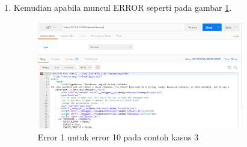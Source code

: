 \begin{enumerate}
\item Kemudian apabila muncul ERROR seperti pada gambar \ref{fig:er1}.
\begin{figure}[!htbp]
	\centerline{\includegraphics[width=0.85\textwidth]{figures/10/er1.PNG}}
	\caption{Error 1 untuk error 10 pada contoh kasus 3}
	\label{fig:er1}
\end{figure}


\end{enumerate}
